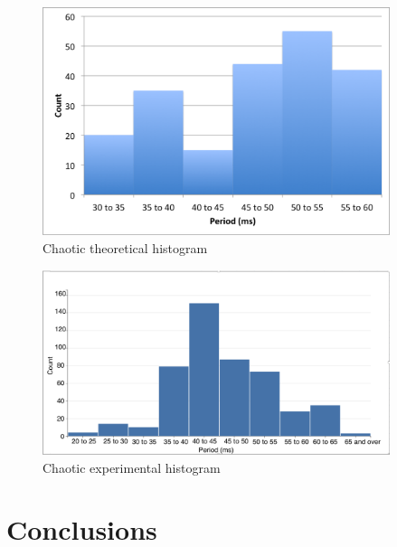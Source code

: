 \documentclass[11pt]{article}
\begin{document}
\begin{figure}[htp]
\begin{center}
\includegraphics[width=4in]{figs/chaotic_hist_th}
\caption{ Chaotic theoretical histogram}
\label{chaotic_hist_th}
\end{center}
\end{figure}
\begin{figure}[htp]
\begin{center}
\includegraphics[width=4in]{figs/chaotic_his}
\caption{ Chaotic experimental histogram}
\label{chaotic_hist}
\end{center}
\end{figure}

\newpage





\section{Conclusions}
\end{document}
